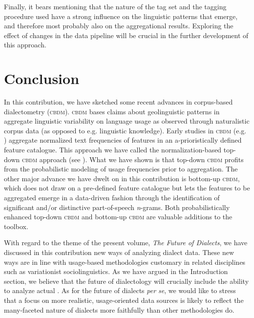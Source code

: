 \documentclass[output=paper]{LSP/langsci}
\begin{document}
Finally, it bears mentioning that the nature of the tag set and the tagging procedure used have a strong influence on the linguistic patterns that emerge, and therefore most probably also on the aggregational results.
Exploring the effect of changes in the data pipeline will be crucial in the further development of this approach.

\section{Conclusion} \label{conclusion}

\largerpage
In this contribution, we have sketched some recent advances in corpus-based dialectometry  (\textsc{cbdm}).
\textsc{cbdm} bases claims about geolinguistic patterns in aggregate linguistic variability on language usage as observed through naturalistic corpus data (as opposed to e.g. linguistic knowledge).
Early studies in \textsc{cbdm} (e.g. \citealt{szmrecsanyi_corpus-based_2011}) aggregate normalized text frequencies of features in an a-prioristically defined feature catalogue.
This approach we have called the normalization-based top-down \textsc{cbdm} approach (see ).
What we have shown is that top-down \textsc{cbdm} profits from the probabilistic modeling of usage frequencies prior to aggregation.
The other major advance we have dwelt on in this contribution is bottom-up \textsc{cbdm}, which does not draw on a pre-defined feature catalogue but lets the features to be aggregated emerge in a data-driven fashion through the identification of significant and/or distinctive part-of-speech \emph{n}-grams.
Both probabilistically enhanced top-down \textsc{cbdm} and bottom-up \textsc{cbdm} are valuable additions to the  toolbox.

With regard to the theme of the present volume, \emph{The Future of Dialects}, we have discussed in this contribution new ways of analyzing dialect data.
These new ways are in line with usage-based methodologies customary in related disciplines such as variationist sociolinguistics. 
As we have argued in the Introduction section, we believe that the future of dialectology will crucially include the ability to analyze actual . 
As for the future of dialects \textit{per se}, we would like to stress that a focus on more realistic, usage-oriented data sources is likely to reflect the many-faceted nature of dialects more faithfully than other methodologies do. 
\end{document}
